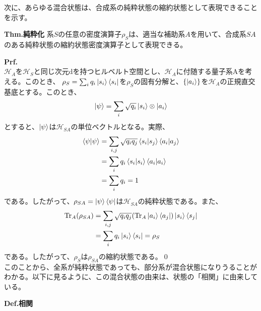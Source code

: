 \documentclass[a4paper,11pt]{jsarticle}
\numberwithin{equation}{section}
\begin{document}
次に、あらゆる混合状態は、合成系の純粋状態の縮約状態として表現できることを示す。
\begin{itembox}[l]{\textbf{Thm.純粋化}}
    系$S$の任意の密度演算子$\rho_S$は、適当な補助系$A$を用いて、合成系$SA$のある純粋状態の縮約状態密度演算子として表現できる。
\end{itembox}
\textbf{Prf.}\\
$\mathcal{H}_A$を$\mathcal{H}_S$と同じ次元dを持つヒルベルト空間とし、$\mathcal{H}_{A}$に付随する量子系Aを考える。このとき、
$\rho_S = \sum_i q_i \ket{s_i}\bra{s_i}$を$\rho_S$の固有分解と、$\{\ket{a_i}\}$を$\mathcal{H}_A$の正規直交基底とする。このとき、
\begin{align}
    \ket{\psi} = \sum_i \sqrt{q_i}\ket{s_i}\otimes\ket{a_i}
\end{align}
とすると、$\ket{\psi}$は$\mathcal{H}_{SA}$の単位ベクトルとなる。実際、
\begin{align}
    \braket{\psi}{\psi} &= \sum_{i,j} \sqrt{q_iq_j}\braket{s_i}{s_j}\braket{a_i}{a_j}\\
    &= \sum_i q_i\braket{s_i}{s_i}\braket{a_i}{a_i}\\
    &= \sum_i q_i = 1
\end{align}
である。したがって、$\rho_{SA} = \ket{\psi}\bra{\psi}$は$\mathcal{H}_{SA}$の純粋状態である。また、
\begin{align}
    \Tr_A(\rho_{SA}) &= \sum_{i,j} \sqrt{q_iq_j}(\Tr_A\ket{a_i}\bra{a_j})\ket{s_i}\bra{s_j}\\
    &= \sum_i q_i\ket{s_i}\bra{s_i} = \rho_S
\end{align}
である。したがって、$\rho_S$は$\rho_{SA}$の縮約状態である。\qed\\

このことから、全系が純粋状態であっても、部分系が混合状態になりうることがわかる。以下に見るように、この混合状態の由来は、状態の「相関」に由来している。

\begin{itembox}[l]{\textbf{Def.相関}}

\end{itembox}
\end{document}
